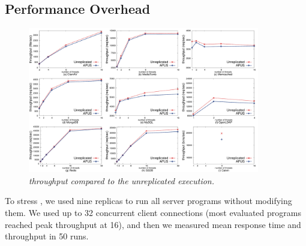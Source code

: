 \subsection{Performance Overhead} \label{sec:overhead}

\begin{figure}[t]
\centering
\includegraphics[width=0.9\textwidth]{figures/throughput}
\vspace{-.10in}
\caption{\small {\em \xxx throughput compared to the unreplicated
execution.}}
\vspace{-.20in}
\label{fig:tput}
\end{figure}


To stress \xxx, we used nine replicas to run all \nprog server 
programs without modifying them. We used up to 32 concurrent 
client connections (most evaluated programs reached peak throughput at 
16), and then we measured mean response time and throughput in 50 runs.



